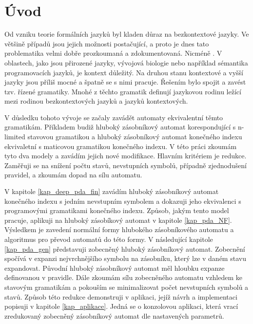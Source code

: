 
\chapter{Úvod}

Od vzniku teorie formálních jazyků byl kladen důraz na bezkontextové jazyky. Ve většině případů jsou jejich možnosti postačující, a proto je dnes tato problematika velmi dobře prozkoumaná a zdokumentovaná. Nicméně  \cite{Dassow:RegulatedRewriting}. V oblastech, jako jsou přirozené jazyky, vývojová biologie nebo například sémantika programovacích jazyků, je kontext důležitý. Na druhou stanu kontextové a vyšší jazyky jsou příliš mocné a špatně se s nimi pracuje. Řešením bylo spojit  \cite{Dassow:RegulatedRewriting} a zavést tzv. řízené gramatiky. Mnohé z těchto gramatik definují jazykovou rodinu ležící mezi rodinou bezkontextových jazyků a jazyků kontextových.

V důsledku tohoto vývoje se začaly zavádět automaty ekvivalentní těmto gramatikám. Příkladem budiž hluboký zásobníkový automat \cite{Meduna:DeepPDA} korespondující s n-limited stavovou gramatikou a hluboký zásobníkový automat konečného indexu \cite{Meduna:FinitelyDeepPDA} ekvivaletní s maticovou gramatikou konečného indexu. V této práci zkoumám tyto dva modely a zavádím jejich nové modifikace. Hlavním kritériem je redukce. Zaměřuji se na snížení počtu stavů, nevstupních symbolů, případně zjednodušení pravidel, a zkoumám dopad na sílu automatu.


V kapitole \ref{kap_deep_pda_fin} zavádím hluboký zásobníkový automat konečného indexu s jedním nevstupním symbolem a dokazuji jeho ekvivalenci s programovými gramatikami konečného indexu. Způsob, jakým tento model pracuje, aplikuji na hluboký zásobíkový automat v kapitole \ref{kap_pda_NF}. Výsledkem je zavedení normální formy hlubokého zásobníkového automatu a algoritmus pro převod automatů do této formy. V následující kapitole \ref{kap_pda_gen} představuji zobecněný hluboký zásobníkový automat. Zobecnění spočívá v expanzi nejvrchnějšího symbolu na zásobníku, který lze v daném stavu expandovat. Původní hluboký zásobníkový automat měl hloubku expanze definovanou v pravidle. Dále zkoumám sílu zobecněného automatu vzhledem ke stavovým gramatikám a pokouším se minimalizovat počet nevstupních symbolů a stavů. Způsob této redukce demonstruji v aplikaci, jejíž návrh a implementaci popisuji v kapitole \ref{kap_aplikace}. Jedná se o konzolovou aplikaci, která vrací zredukovaný zobecněný zásobníkový automat dle nastavených parametrů.


